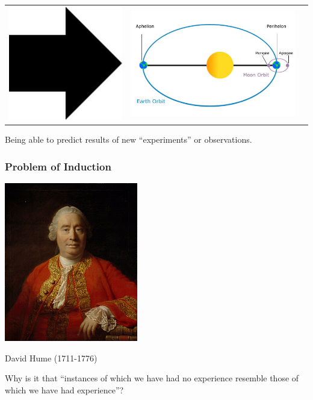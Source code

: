 \documentclass{beamer}
\begin{document}
\begin{frame}
\begin{center}
\begin{tabular}{ccc}
\includegraphics[scale = 0.3]{right_arrow.jpg} &
\includegraphics[scale = 0.3]{orbit-3.jpg} 
\end{tabular}
\end{center}
Being able to predict results of new ``experiments'' or observations.
\end{frame}

\begin{frame}
\frametitle{Problem of Induction}
\begin{center}
\includegraphics[scale = 0.6]{david_hume.jpg}

David Hume (1711-1776)
\end{center}
Why is it that ``instances of which we have had no experience resemble
those of which we have had experience''?
\end{frame}
\end{document}
